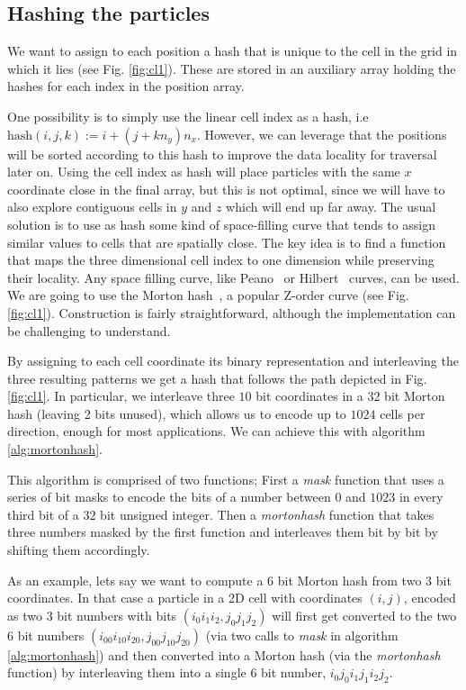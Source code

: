 \documentclass[ twoside,openright,titlepage,numbers=noenddot,%
headinclude,footinclude,cleardoublepage=empty,abstract=on,
BCOR=5mm,paper=b5,fontsize=11pt, dvipsnames
]{scrreprt}
\begin{document}
\subsection*{Hashing the particles}

We want to assign to each position a hash that is unique to the cell in the grid in which it lies (see Fig. \ref{fig:cl1}).
These are stored in an auxiliary array holding the hashes for each index in the position array.

One possibility is to simply use the linear cell index as a hash, i.e $\textrm{hash}(i,j,k) := i + (j + kn_y)n_x$.
However, we can leverage that the positions will be sorted according to this hash to improve the data locality for traversal later on. Using the cell index as hash will place particles with the same $x$ coordinate close in the final array, but this is not optimal, since we will have to also explore contiguous cells in $y$ and $z$ which will end up far away.
The usual solution is to use as hash some kind of space-filling curve that tends to assign similar values to cells that are spatially close. The key idea is to find a function that maps the three dimensional cell index to one dimension while preserving their locality. Any space filling curve, like Peano~\cite{Peano1890} or Hilbert~\cite{Hilbert1935} curves, can be used.
We are going to use the Morton hash~\cite{Morton1966}, a popular Z-order curve (see Fig. \ref{fig:cl1}). Construction is fairly straightforward, although the implementation can be challenging to understand.

By assigning to each cell coordinate its binary representation and interleaving the three resulting patterns we get a hash that follows the path depicted in Fig. \ref{fig:cl1}. In particular, we interleave three $10$ bit coordinates in a $32$ bit Morton hash (leaving 2 bits unused), which allows us to encode up to $1024$ cells per direction, enough for most applications. We can achieve this with algorithm \ref{alg:mortonhash}.

This algorithm is comprised of two functions; First a \emph{mask} function that uses a series of bit masks to encode the bits of a number between $0$ and $1023$ in every third bit of a $32$ bit unsigned integer. Then a \emph{mortonhash} function that takes three numbers masked by the first function and interleaves them bit by bit by shifting them accordingly.

As an example, lets say we want to compute a $6$ bit Morton hash from two $3$ bit coordinates. In that case a particle in a 2D cell with coordinates $(i,j)$, encoded as two $3$ bit numbers with bits $(i_0i_1i_2, j_0j_1j_2)$ will first get converted to the two $6$ bit numbers $(i_00i_10i_20, j_00j_10j_20)$ (via two calls to \emph{mask} in algorithm \ref{alg:mortonhash}) and then converted into a Morton hash (via the \emph{mortonhash} function) by interleaving them into a single $6$ bit number, $i_0j_0i_1j_1i_2j_2$.
\end{document}
